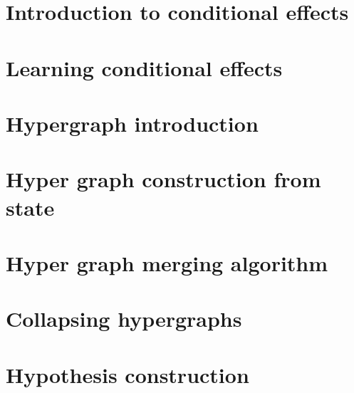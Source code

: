 \documentclass[Master.tex]{subfiles}
\begin{document}
\section{Introduction to conditional effects}
    

\section{Learning conditional effects}
    

\section{Hypergraph introduction}
    

\section{Hyper graph construction from state}
	

\section{Hyper graph merging algorithm}
    \label{sec:C:HGMerging}

\section{Collapsing hypergraphs}
	

\section{Hypothesis construction}
\end{document}
